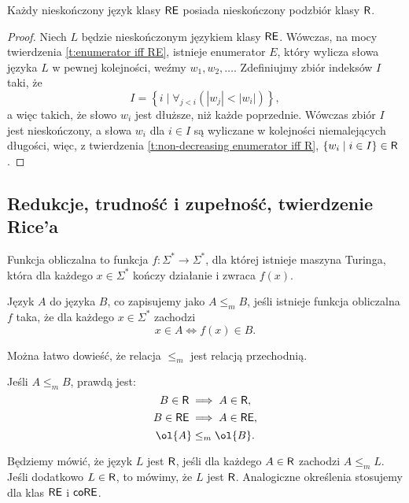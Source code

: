 \begin{theorem}
    Każdy nieskończony język klasy $\textsf{RE}$ posiada nieskończony podzbiór klasy $\textsf{R}$.
\end{theorem}
\begin{proof}
    Niech $L$ będzie nieskończonym językiem klasy $\textsf{RE}$. Wówczas, na mocy twierdzenia \ref{t:enumerator iff RE}, istnieje enumerator $E$, który wylicza słowa języka $L$ w pewnej kolejności, weźmy $w_1, w_2, \ldots$. Zdefiniujmy zbiór indeksów $I$ taki, że
    \[ I = \left\{i \mid \forall_{j < i} \left(|w_j| < |w_i|\right)\right\}, \]
    a więc takich, że słowo $w_i$ jest dłuższe, niż każde poprzednie.
    Wówczas zbiór $I$ jest nieskończony, a słowa $w_i$ dla $i \in I$ są wyliczane w kolejności niemalejących długości, więc, z twierdzenia \ref{t:non-decreasing enumerator iff R}, $\{w_i \mid i \in I\} \in \textsf{R}$.
\end{proof}

\subsection{Redukcje, trudność i zupełność, twierdzenie Rice'a}
\begin{definition}
    Funkcja obliczalna to funkcja $f : \Sigma^* \to \Sigma^*$, dla której istnieje maszyna Turinga, która dla każdego $x \in \Sigma^*$ kończy działanie i zwraca $f(x)$.
\end{definition}

\begin{definition}\label{d:many-one reduction}
    Język $A$  do języka $B$, co zapisujemy jako $A \leq_m B$, jeśli istnieje funkcja obliczalna $f$ taka, że dla każdego $x \in \Sigma^*$ zachodzi
\[ x \in A \iff f(x) \in B. \]
\end{definition}

Można łatwo dowieść, że relacja $\leq_m$ jest relacją przechodnią.

\begin{fact}
    Jeśli $A \leq_m B$, prawdą jest:
    \[ B \in \textsf{R} \implies A \in \textsf{R}, \]
    \[ B \in \textsf{RE} \implies A \in \textsf{RE}, \]
    \[ \ol{A} \leq_m \ol{B}. \]
\end{fact}

Będziemy mówić, że język $L$ jest $\textsf{R}$, jeśli dla każdego $A \in \textsf{R}$ zachodzi $A \leq_m L$. Jeśli dodatkowo $L \in \textsf{R}$, to mówimy, że $L$ jest $\textsf{R}$. Analogiczne określenia stosujemy dla klas $\textsf{RE}$ i $\textsf{coRE}$.

